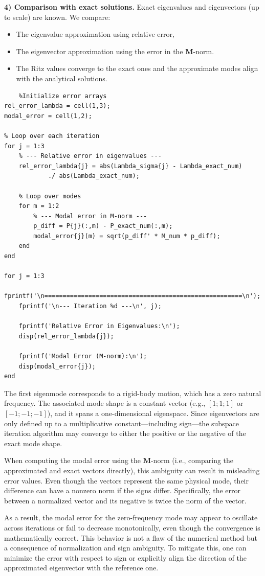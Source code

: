 \documentclass[12pt]{article}
\begin{document}
\textbf{4) Comparison with exact solutions.} Exact eigenvalues and eigenvectors (up to scale) are known. We compare:
\begin{itemize}
   \item The eigenvalue approximation using relative error,
   \item The eigenvector approximation using the error in the $\mathbf M$-norm.
   \item The Ritz values converge to the exact ones and the approximate modes align with the analytical solutions.
\end{itemize}

\begin{verbatim}   
    %Initialize error arrays
rel_error_lambda = cell(1,3);
modal_error = cell(1,2);

% Loop over each iteration 
for j = 1:3
    % --- Relative error in eigenvalues ---
    rel_error_lambda{j} = abs(Lambda_sigma{j} - Lambda_exact_num) 
            ./ abs(Lambda_exact_num);

    % Loop over modes
    for m = 1:2
        % --- Modal error in M-norm ---
        p_diff = P{j}(:,m) - P_exact_num(:,m);
        modal_error{j}(m) = sqrt(p_diff' * M_num * p_diff);
    end
end    

for j = 1:3
    fprintf('\n======================================================\n');
    fprintf('\n--- Iteration %d ---\n', j);
    
    fprintf('Relative Error in Eigenvalues:\n');
    disp(rel_error_lambda{j});
  
    fprintf('Modal Error (M-norm):\n');
    disp(modal_error{j});
end
\end{verbatim}
The first eigenmode corresponds to a rigid-body motion, which has a zero natural frequency. The associated mode shape is a constant vector (e.g., \([1; 1; 1]\) or \([-1; -1; -1]\)), and it spans a one-dimensional eigenspace. Since eigenvectors are only defined up to a multiplicative constant—including sign—the subspace iteration algorithm may converge to either the positive or the negative of the exact mode shape.

When computing the modal error using the \( \mathbf{M} \)-norm (i.e., comparing the approximated and exact vectors directly), this ambiguity can result in misleading error values. Even though the vectors represent the same physical mode, their difference can have a nonzero norm if the signs differ. Specifically, the error between a normalized vector and its negative is twice the norm of the vector.

As a result, the modal error for the zero-frequency mode may appear to oscillate across iterations or fail to decrease monotonically, even though the convergence is mathematically correct. This behavior is not a flaw of the numerical method but a consequence of normalization and sign ambiguity. To mitigate this, one can minimize the error with respect to sign or explicitly align the direction of the approximated eigenvector with the reference one.
\end{document}
